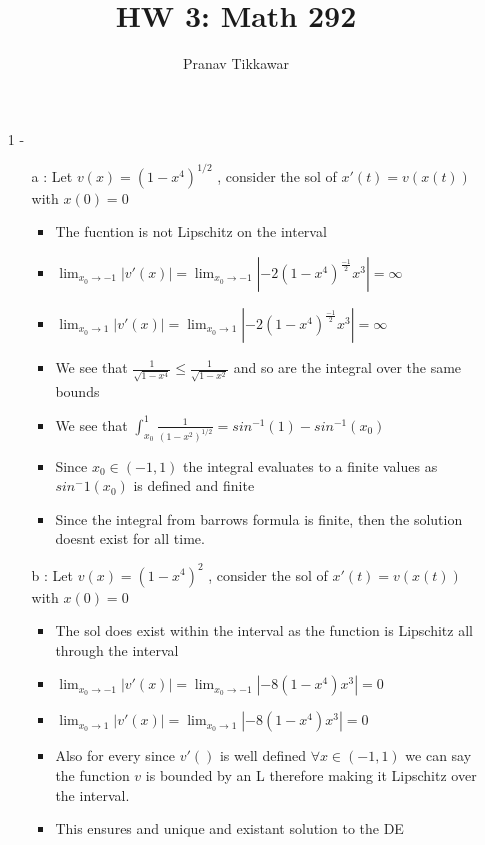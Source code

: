 \documentclass{article}
\author{Pranav Tikkawar}
\title{HW 3: Math 292}
\begin{document}
\maketitle

\begin{enumerate}
    \item [1] - \begin{enumerate}
        \item [a]: Let $v(x) = (1-x^4)^{1/2}$ , consider the sol of $x'(t) = v(x(t))$ with $x(0) = 0$ \begin{itemize}
            \item The fucntion is not Lipschitz on the interval
            \item $\lim_{x_0 \rightarrow -1} |v'(x)| =  \lim_{x_0 \rightarrow -1} |-2(1-x^4)^{\frac{-1}{2}}x^3| = \infty$ 
            \item $\lim_{x_0 \rightarrow 1} |v'(x)| =  \lim_{x_0 \rightarrow 1} |-2(1-x^4)^{\frac{-1}{2}}x^3| = \infty$ 
            \item We see that $\frac{1}{\sqrt{1-x^4}} \leq \frac{1}{\sqrt{1-x^2}}$ and so are the integral over the same bounds
            \item We see that $\int_{x_0}^{1}\frac{1}{(1-x^2)^{1/2}} = sin^{-1}(1)- sin^{-1}(x_0)$ 
            \item Since $x_0 \in (-1,1)$ the integral evaluates to a finite values as $sin^-1(x_0)$ is defined and finite
            \item Since the integral from barrows formula is finite, then the solution doesnt exist for all time.
        \end{itemize}
        \item [b]: Let $v(x) = (1-x^4)^{2}$ , consider the sol of $x'(t) = v(x(t))$ with $x(0) = 0$ \begin{itemize}
            \item The sol does exist within the interval as the function is Lipschitz all through the interval
            \item $\lim_{x_0 \rightarrow -1} |v'(x)| =  \lim_{x_0 \rightarrow -1} |-8(1-x^4)x^3| = 0$
            \item $\lim_{x_0 \rightarrow 1} |v'(x)| =  \lim_{x_0 \rightarrow 1} |-8(1-x^4)x^3| = 0$
            \item Also for every since $v'()$ is well defined $\forall x \in (-1,1)$ we can say the function $v$ is bounded by an L therefore making it Lipschitz over the interval. 
            \item This ensures and unique and existant solution to the DE

\end{itemize}
\end{enumerate}
\end{enumerate}
\end{document}
